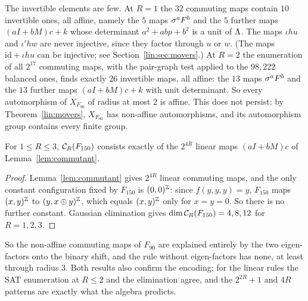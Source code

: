 The invertible elements are few. At $R=1$ the $32$ commuting maps contain $10$ invertible ones, all affine, namely the $5$ maps $\sigma^aF^b$ and the $5$ further maps $(aI+bM)c+k$ whose determinant $a^2+abp+b^2$ is a unit of $\Lambda$. The maps $\iota hu$ and $\iota'hw$ are never injective, since they factor through $u$ or $w$. (The maps $\mathrm{id}+\iota hu$ can be injective; see Section~\ref{lin:sec:movers}.) At $R=2$ the enumeration of all $2^{17}$ commuting maps, with the pair-graph test applied to the $98{,}222$ balanced ones, finds exactly $26$ invertible maps, all affine: the $13$ maps $\sigma^aF^b$ and the $13$ further maps $(aI+bM)c+k$ with unit determinant. So every automorphism of $X_{F_{90}}$ of radius at most $2$ is affine. This does not persist: by Theorem~\ref{lin:movers}, $X_{F_{90}}$ has non-affine automorphisms, and its automorphism group contains every finite group.

\begin{proposition}\label{prop:150}
For $1\le R\le3$, $\mathcal{C}_R(F_{150})$ consists exactly of the $2^{4R}$ linear maps $(aI+bM)c$ of Lemma~\ref{lem:commutant}.
\end{proposition}

\begin{proof}
Lemma~\ref{lem:commutant} gives $2^{4R}$ linear commuting maps, and the only constant configuration fixed by $F_{150}$ is $(0,0)^{\mathbb{Z}}$: since $f(y,y,y)=y$, $F_{150}$ maps $(x,y)^{\mathbb{Z}}$ to $(y,x\oplus y)^{\mathbb{Z}}$, which equals $(x,y)^{\mathbb{Z}}$ only for $x=y=0$. So there is no further constant. Gaussian elimination gives $\dim\mathcal{C}_R(F_{150})=4,8,12$ for $R=1,2,3$.
\end{proof}

So the non-affine commuting maps of $F_{90}$ are explained entirely by the two eigen-factors onto the binary shift, and the rule without eigen-factors has none, at least through radius $3$. Both results also confirm the encoding: for the linear rules the SAT enumeration at $R\le2$ and the elimination agree, and the $2^{2R}+1$ and $4R$ patterns are exactly what the algebra predicts.

